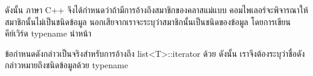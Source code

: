 ดังนั้น ภาษา C++ จึง{\wbr}ได้{\wbr}กำหนด{\wbr}ว่า{\wbr}ถ้า{\wbr}มี{\wbr}การ{\wbr}อ้าง{\wbr}ถึง{\wbr}สมาชิก{\wbr}ของ{\wbr}ค{\wbr}ลา{\wbr}ส{\wbr}แม่แบบ{\wbr}
คอม{\wbr}ไพ{\wbr}เลอร์{\wbr}จะ{\wbr}พิจารณา{\wbr}ให้{\wbr}สมาชิก{\wbr}นั้น{\wbr}ไม่{\wbr}เป็น{\wbr}ชนิด{\wbr}ข้อมูล{\wbr}
นอก{\wbr}เสีย{\wbr}จาก{\wbr}เรา{\wbr}จะ{\wbr}ระบุ{\wbr}ว่า{\wbr}สมาชิก{\wbr}นั้น{\wbr}เป็น{\wbr}ชนิด{\wbr}ของ{\wbr}ข้อมูล โดย{\wbr}การ{\wbr}เขียน{\wbr}คีย์{\wbr}เวิร์ด {\ct
  typename} นำหน้า{\wbr}

ข้อกำหนด{\wbr}ดังกล่าว{\wbr}เป็นจริง{\wbr}สำหรับ{\wbr}การ{\wbr}อ้าง{\wbr}ถึง {\ct list<T>::iterator} ด้วย ดังนั้น{\wbr}
เรา{\wbr}จึง{\wbr}ต้อง{\wbr}ระบุ{\wbr}ว่า{\wbr}ชื่อดัง{\wbr}กล่าว{\wbr}หมายถึง{\wbr}ชนิด{\wbr}ข้อมูล{\wbr}ด้วย {\ct typename}

